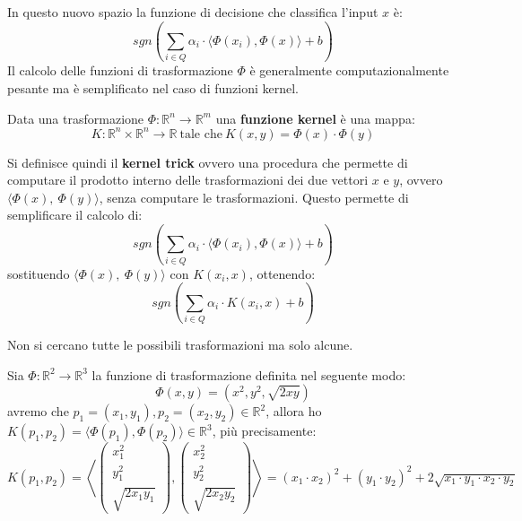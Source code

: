 In questo nuovo spazio la funzione di decisione che classifica l'input $x$ è:
\begin{equation}
    sgn\left(\sum_{i \in Q} \alpha_i \cdot \langle \Phi(x_i), \Phi(x)\rangle + b
    \right)
\end{equation}
Il calcolo delle funzioni di trasformazione $\Phi$ è generalmente computazionalmente
pesante ma è semplificato nel caso di funzioni kernel.
\begin{definizione}
    Data una trasformazione $\Phi: \mathbb{R}^n \to \mathbb{R}^m$ una
    \textbf{funzione kernel} è una mappa:
    \begin{equation}
        K: \mathbb{R}^n \times \mathbb{R}^n \to \mathbb{R} \ \text{tale che} \
        K(x, y) = \Phi(x) \cdot \Phi(y)
    \end{equation}
\end{definizione}
\begin{definizione}
    Si definisce quindi il \textbf{kernel trick} ovvero una procedura che permette
    di computare il prodotto interno delle trasformazioni dei due vettori $x$ e
    $y$, ovvero $\langle\Phi(x), \ \Phi(y)\rangle$, senza computare le
    trasformazioni. Questo permette di semplificare il calcolo di:
    \begin{equation}
        sgn\left(\sum_{i \in Q} \alpha_i \cdot \langle \Phi(x_i), \Phi(x) \rangle
        + b \right)
    \end{equation}
    sostituendo $\langle\Phi(x), \ \Phi(y)\rangle$ con $K(x_i, x)$, ottenendo:
    \begin{equation}
        sgn\left(\sum_{i \in Q} \alpha_i \cdot K(x_i, x) + b \right)
    \end{equation}
\end{definizione}
\begin{nota}
    Non si cercano tutte le possibili trasformazioni ma solo alcune.
\end{nota}
\begin{esempio}
    Sia $\Phi:\mathbb{R}^2\rightarrow\mathbb{R}^3$ la funzione di trasformazione
    definita nel seguente modo:
    \begin{equation}
        \Phi(x,y) =(x^2,y^2,\sqrt{2xy})
    \end{equation}
    avremo che $p_1 = (x_1, y_1), p_2 = (x_2, y_2) \in \mathbb{R}^2$, allora ho
    $K(p_1, p_2) = \langle \Phi(p_1), \Phi(p_2) \rangle \in\mathbb{R}^3$,
    più precisamente:
    $$K(p_1,p_2) = \left\langle\left(\begin{array}{c}
                x_1^2 \\
                y_1^2 \\
                \sqrt{2x_1y_1}
            \end{array}\right),\left(\begin{array}{c}
                x_2^2 \\
                y_2^2 \\
                \sqrt{2x_2y_2}
            \end{array}\right)\right\rangle = (x_1 \cdot x_2)^2 + (y_1 \cdot
        y_2)^2 + 2 \sqrt{x_1 \cdot y_1 \cdot x_2 \cdot y_2}$$
\end{esempio}
